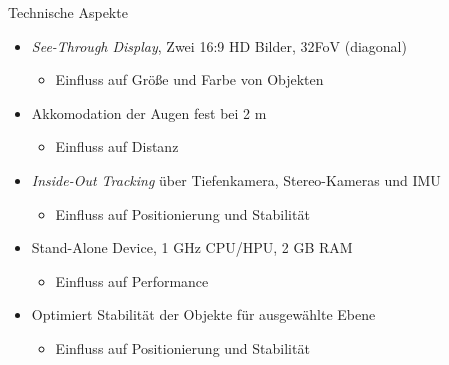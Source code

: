 \begin{frame}[fragile]{Technische Aspekte}
		\begin{itemize}
			\item \textit{See-Through Display}, Zwei 16:9 HD Bilder, 32\degree FoV (diagonal)
			\begin{itemize}[topsep=-5px]
				\setlength{\itemsep}{-5px}
				\item Einfluss auf Größe und Farbe von Objekten
			\end{itemize}
			\pause
			\item Akkomodation der Augen fest bei 2 m
			\begin{itemize}[topsep=-5px]
				\setlength{\itemsep}{-5px}
				\item Einfluss auf Distanz
			\end{itemize}
			\item \textit{Inside-Out Tracking} über Tiefenkamera, Stereo-Kameras und IMU
			\begin{itemize}[topsep=-5px]
				\setlength{\itemsep}{-5px}
				\item Einfluss auf Positionierung und Stabilität
			\end{itemize}
			\pause
			\item Stand-Alone Device, 1 GHz CPU/HPU, 2 GB RAM
			\begin{itemize}[topsep=-5px]
				\setlength{\itemsep}{-5px}
				\item Einfluss auf Performance
			\end{itemize}
			\item Optimiert Stabilität der Objekte für ausgewählte Ebene
			\begin{itemize}[topsep=-5px]
				\setlength{\itemsep}{-5px}
				\item Einfluss auf Positionierung und Stabilität
			\end{itemize}
		\end{itemize}
\end{frame}

